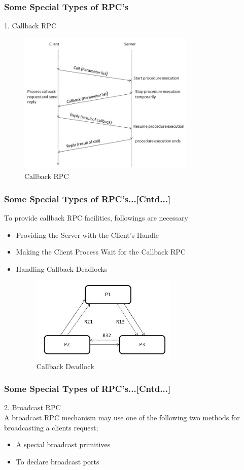\documentclass{beamer}
\begin{document}
\begin{frame}
	\frametitle{Some Special Types of RPC's}
	\vspace{0.2cm}
	1. Callback RPC
	\begin{figure}
		\centering
		\includegraphics[width=8.5cm]{fig412.jpg}
		\caption{Callback RPC}
	\end{figure}
\end{frame}

\begin{frame}
	\frametitle{Some Special Types of RPC's...[Cntd...]}
	\vspace{0.5cm}
	To provide callback RPC facilities, followings are necessary
	\vspace{0.5cm}
	\begin{itemize}
		\item Providing the Server with the Client's Handle
		\item Making the Client Process Wait for the Callback RPC
		\item Handling Callback Deadlocks
		\begin{figure}
			\centering
			\includegraphics[width=7cm]{fig413.jpg}
			\caption{Callback Deadlock}
		\end{figure}
	\end{itemize}
\end{frame}


\begin{frame}
	\frametitle{Some Special Types of RPC's...[Cntd...]}
	2. Broadcast RPC\\
	\vspace{0.5cm}	
	A broadcast RPC mechanism may use one of the following two methods for broadcasting a 
	clients request;
	\begin{itemize}
		\item A special broadcast primitives
		\item To declare broadcast ports
	\end{itemize}	
	\vspace{4cm}	
\end{frame}
\end{document}
